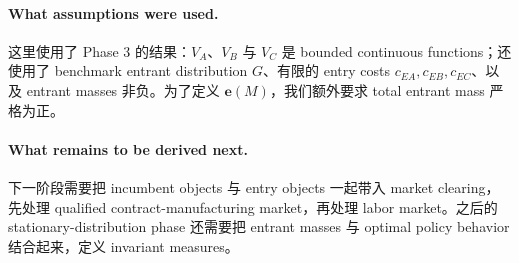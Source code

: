 \paragraph{What assumptions were used.}
这里使用了 Phase 3 的结果：$V_A$、$V_B$ 与 $V_C$ 是 bounded continuous functions；还使用了 benchmark entrant distribution $G$、有限的 entry costs $c_{EA},c_{EB},c_{EC}$、以及 entrant masses 非负。为了定义 $\mathbf e(M)$，我们额外要求 total entrant mass 严格为正。

\paragraph{What remains to be derived next.}
下一阶段需要把 incumbent objects 与 entry objects 一起带入 market clearing，先处理 qualified contract-manufacturing market，再处理 labor market。之后的 stationary-distribution phase 还需要把 entrant masses 与 optimal policy behavior 结合起来，定义 invariant measures。
